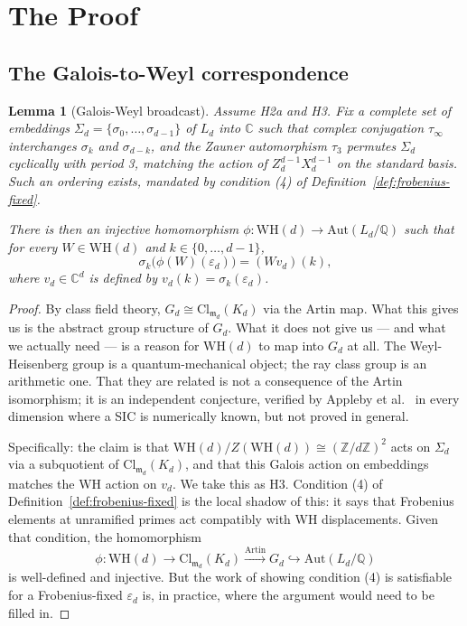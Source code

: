 \documentclass[12pt]{article}
\theoremstyle{plain}
\newtheorem{lemmainner}[theoreminner]{Lemma}
\theoremstyle{definition}
\theoremstyle{remark}
\newenvironment{lemma}{\begin{mdframed}[style=thmstyle]\begin{lemmainner}}{\end{lemmainner}\end{mdframed}}
\newcommand{\WH}{\mathrm{WH}}
\newcommand{\eps}{\varepsilon}
\newcommand{\bQ}{\mathbb{Q}}
\newcommand{\bC}{\mathbb{C}}
\newcommand{\bZ}{\mathbb{Z}}
\begin{document}
\section{The Proof}
\label{sec:proof}

\subsection{The Galois-to-Weyl correspondence}

\begin{lemma}[Galois-Weyl broadcast]
  \label{lem:galois-weyl}
  Assume H2a and H3. Fix a complete set of embeddings $\Sigma_d = \{\sigma_0, \ldots, \sigma_{d-1}\}$ of $L_d$ into $\bC$ such that complex conjugation $\tau_\infty$ interchanges $\sigma_k$ and $\sigma_{d-k}$, and the Zauner automorphism $\tau_3$ permutes $\Sigma_d$ cyclically with period 3, matching the action of $Z_d^{d-1} X_d^{d-1}$ on the standard basis. Such an ordering exists, mandated by condition (4) of Definition~\ref{def:frobenius-fixed}.

  There is then an injective homomorphism $\phi : \WH(d) \to \mathrm{Aut}(L_d/\bQ)$ such that for every $W \in \WH(d)$ and $k \in \{0, \ldots, d-1\}$,
  \[
    \sigma_k\!\bigl(\phi(W)(\eps_d)\bigr) = (W v_d)(k),
  \]
  where $v_d \in \bC^d$ is defined by $v_d(k) = \sigma_k(\eps_d)$.
\end{lemma}

\begin{proof}
  By class field theory, $G_d \cong \mathrm{Cl}_{\mathfrak{m}_d}(K_d)$ via the Artin map. What this gives us is the abstract group structure of $G_d$. What it does not give us — and what we actually need — is a reason for $\WH(d)$ to map into $G_d$ at all. The Weyl-Heisenberg group is a quantum-mechanical object; the ray class group is an arithmetic one. That they are related is not a consequence of the Artin isomorphism; it is an independent conjecture, verified by Appleby et al.\ \cite{afmy2017} in every dimension where a SIC is numerically known, but not proved in general.

  Specifically: the claim is that $\WH(d)/Z(\WH(d)) \cong (\bZ/d\bZ)^2$ acts on $\Sigma_d$ via a subquotient of $\mathrm{Cl}_{\mathfrak{m}_d}(K_d)$, and that this Galois action on embeddings matches the WH action on $v_d$. We take this as H3. Condition (4) of Definition~\ref{def:frobenius-fixed} is the local shadow of this: it says that Frobenius elements at unramified primes act compatibly with WH displacements. Given that condition, the homomorphism
  \[
    \phi : \WH(d) \to \mathrm{Cl}_{\mathfrak{m}_d}(K_d) \xrightarrow{\mathrm{Artin}} G_d \hookrightarrow \mathrm{Aut}(L_d/\bQ)
  \]
  is well-defined and injective. But the work of showing condition (4) is satisfiable for a Frobenius-fixed $\eps_d$ is, in practice, where the argument would need to be filled in.
\end{proof}
\end{document}

